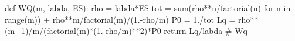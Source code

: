 
def WQ(m, labda, ES):
    rho = labda*ES
    tot = sum(rho**n/factorial(n) for n in range(m)) +
rho**m/factorial(m)/(1.-rho/m)
    P0 = 1./tot
    Lq = rho**(m+1)/m/(factorial(m)*(1.-rho/m)**2)*P0
    return Lq/labda # Wq


